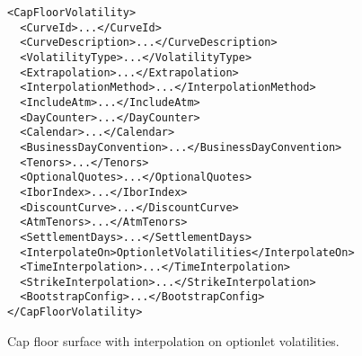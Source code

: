 \begin{longlisting}
\begin{verbatim}
<CapFloorVolatility>
  <CurveId>...</CurveId>
  <CurveDescription>...</CurveDescription>
  <VolatilityType>...</VolatilityType>
  <Extrapolation>...</Extrapolation>
  <InterpolationMethod>...</InterpolationMethod>
  <IncludeAtm>...</IncludeAtm>
  <DayCounter>...</DayCounter>
  <Calendar>...</Calendar>
  <BusinessDayConvention>...</BusinessDayConvention>
  <Tenors>...</Tenors>
  <OptionalQuotes>...</OptionalQuotes>
  <IborIndex>...</IborIndex>
  <DiscountCurve>...</DiscountCurve>
  <AtmTenors>...</AtmTenors>
  <SettlementDays>...</SettlementDays>
  <InterpolateOn>OptionletVolatilities</InterpolateOn>
  <TimeInterpolation>...</TimeInterpolation>
  <StrikeInterpolation>...</StrikeInterpolation>
  <BootstrapConfig>...</BootstrapConfig>
</CapFloorVolatility>
\end{verbatim}
\caption{Cap floor surface with interpolation on optionlet volatilities.}
\label{lst:capfloorvol_surface_configuration_opt}
\end{longlisting}
